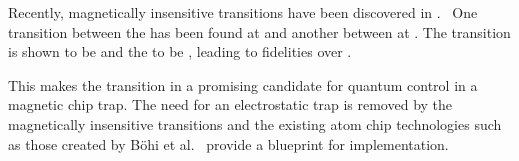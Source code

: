 Recently, magnetically insensitive transitions have been discovered in
\CaF.~\cite{PhysRevLett.120.163201, Blackmore_2018, }  One transition between the  has been found at  and another between 
at . The  transition is shown to be 
and the  to be , leading to fidelities over
.

This makes the  transition in \CaF a promising candidate for
quantum control in a magnetic chip trap. The need for an electrostatic trap is
removed by the magnetically insensitive transitions and the existing atom chip
technologies such as those created by B\"ohi et al.~\cite{Boehi2009} provide a
blueprint for implementation.
